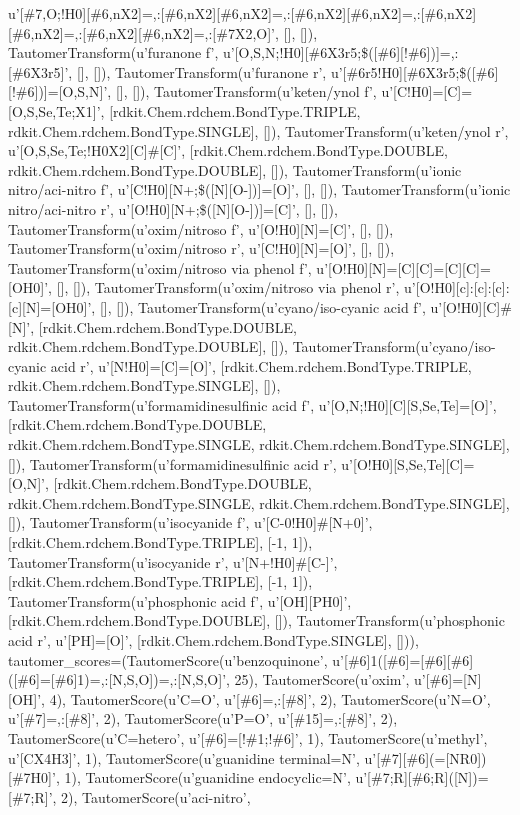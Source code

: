 \documentclass[letterpaper,10pt,english]{sphinxmanual}
\begin{document}
\begin{fulllineitems}
u'{[}\#7,O;!H0{]}{[}\#6,nX2{]}=,:{[}\#6,nX2{]}{[}\#6,nX2{]}=,:{[}\#6,nX2{]}{[}\#6,nX2{]}=,:{[}\#6,nX2{]}{[}\#6,nX2{]}=,:{[}\#6,nX2{]}{[}\#6,nX2{]}=,:{[}\#7X2,O{]}', {[}{]}, {[}{]}), TautomerTransform(u'furanone f', u'{[}O,S,N;!H0{]}{[}\#6X3r5;\$({[}\#6{]}{[}!\#6{]}){]}=,:{[}\#6X3r5{]}', {[}{]}, {[}{]}), TautomerTransform(u'furanone r', u'{[}\#6r5!H0{]}{[}\#6X3r5;\$({[}\#6{]}{[}!\#6{]}){]}={[}O,S,N{]}', {[}{]}, {[}{]}), TautomerTransform(u'keten/ynol f', u'{[}C!H0{]}={[}C{]}={[}O,S,Se,Te;X1{]}', {[}rdkit.Chem.rdchem.BondType.TRIPLE, rdkit.Chem.rdchem.BondType.SINGLE{]}, {[}{]}), TautomerTransform(u'keten/ynol r', u'{[}O,S,Se,Te;!H0X2{]}{[}C{]}\#{[}C{]}', {[}rdkit.Chem.rdchem.BondType.DOUBLE, rdkit.Chem.rdchem.BondType.DOUBLE{]}, {[}{]}), TautomerTransform(u'ionic nitro/aci-nitro f', u'{[}C!H0{]}{[}N+;\$({[}N{]}{[}O-{]}){]}={[}O{]}', {[}{]}, {[}{]}), TautomerTransform(u'ionic nitro/aci-nitro r', u'{[}O!H0{]}{[}N+;\$({[}N{]}{[}O-{]}){]}={[}C{]}', {[}{]}, {[}{]}), TautomerTransform(u'oxim/nitroso f', u'{[}O!H0{]}{[}N{]}={[}C{]}', {[}{]}, {[}{]}), TautomerTransform(u'oxim/nitroso r', u'{[}C!H0{]}{[}N{]}={[}O{]}', {[}{]}, {[}{]}), TautomerTransform(u'oxim/nitroso via phenol f', u'{[}O!H0{]}{[}N{]}={[}C{]}{[}C{]}={[}C{]}{[}C{]}={[}OH0{]}', {[}{]}, {[}{]}), TautomerTransform(u'oxim/nitroso via phenol r', u'{[}O!H0{]}{[}c{]}:{[}c{]}:{[}c{]}:{[}c{]}{[}N{]}={[}OH0{]}', {[}{]}, {[}{]}), TautomerTransform(u'cyano/iso-cyanic acid f', u'{[}O!H0{]}{[}C{]}\#{[}N{]}', {[}rdkit.Chem.rdchem.BondType.DOUBLE, rdkit.Chem.rdchem.BondType.DOUBLE{]}, {[}{]}), TautomerTransform(u'cyano/iso-cyanic acid r', u'{[}N!H0{]}={[}C{]}={[}O{]}', {[}rdkit.Chem.rdchem.BondType.TRIPLE, rdkit.Chem.rdchem.BondType.SINGLE{]}, {[}{]}), TautomerTransform(u'formamidinesulfinic acid f', u'{[}O,N;!H0{]}{[}C{]}{[}S,Se,Te{]}={[}O{]}', {[}rdkit.Chem.rdchem.BondType.DOUBLE, rdkit.Chem.rdchem.BondType.SINGLE, rdkit.Chem.rdchem.BondType.SINGLE{]}, {[}{]}), TautomerTransform(u'formamidinesulfinic acid r', u'{[}O!H0{]}{[}S,Se,Te{]}{[}C{]}={[}O,N{]}', {[}rdkit.Chem.rdchem.BondType.DOUBLE, rdkit.Chem.rdchem.BondType.SINGLE, rdkit.Chem.rdchem.BondType.SINGLE{]}, {[}{]}), TautomerTransform(u'isocyanide f', u'{[}C-0!H0{]}\#{[}N+0{]}', {[}rdkit.Chem.rdchem.BondType.TRIPLE{]}, {[}-1, 1{]}), TautomerTransform(u'isocyanide r', u'{[}N+!H0{]}\#{[}C-{]}', {[}rdkit.Chem.rdchem.BondType.TRIPLE{]}, {[}-1, 1{]}), TautomerTransform(u'phosphonic acid f', u'{[}OH{]}{[}PH0{]}', {[}rdkit.Chem.rdchem.BondType.DOUBLE{]}, {[}{]}), TautomerTransform(u'phosphonic acid r', u'{[}PH{]}={[}O{]}', {[}rdkit.Chem.rdchem.BondType.SINGLE{]}, {[}{]})), tautomer\_scores=(TautomerScore(u'benzoquinone', u'{[}\#6{]}1({[}\#6{]}={[}\#6{]}{[}\#6{]}({[}\#6{]}={[}\#6{]}1)=,:{[}N,S,O{]})=,:{[}N,S,O{]}', 25), TautomerScore(u'oxim', u'{[}\#6{]}={[}N{]}{[}OH{]}', 4), TautomerScore(u'C=O', u'{[}\#6{]}=,:{[}\#8{]}', 2), TautomerScore(u'N=O', u'{[}\#7{]}=,:{[}\#8{]}', 2), TautomerScore(u'P=O', u'{[}\#15{]}=,:{[}\#8{]}', 2), TautomerScore(u'C=hetero', u'{[}\#6{]}={[}!\#1;!\#6{]}', 1), TautomerScore(u'methyl', u'{[}CX4H3{]}', 1), TautomerScore(u'guanidine terminal=N', u'{[}\#7{]}{[}\#6{]}(={[}NR0{]}){[}\#7H0{]}', 1), TautomerScore(u'guanidine endocyclic=N', u'{[}\#7;R{]}{[}\#6;R{]}({[}N{]})={[}\#7;R{]}', 2), TautomerScore(u'aci-nitro', 
\end{fulllineitems}
\end{document}
